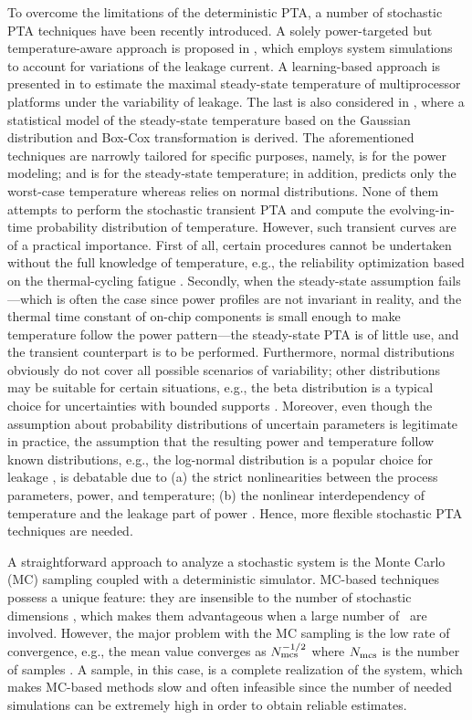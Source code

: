 To overcome the limitations of the deterministic PTA, a number of stochastic PTA techniques have been recently introduced. A solely power-targeted but temperature-aware approach is proposed in \cite{chandra2010}, which employs system simulations to account for variations of the leakage current. A learning-based approach is presented in \cite{juan2011} to estimate the maximal steady-state temperature of multiprocessor platforms under the variability of leakage. The last is also considered in \cite{juan2012}, where a statistical model of the steady-state temperature based on the Gaussian distribution and Box-Cox transformation is derived. The aforementioned techniques are narrowly tailored for specific purposes, namely, \cite{chandra2010} is for the power modeling; \cite{juan2011} and \cite{juan2012} is for the steady-state temperature; in addition, \cite{juan2011} predicts only the worst-case temperature whereas \cite{juan2012} relies on normal distributions. None of them attempts to perform the stochastic transient PTA and compute the evolving-in-time probability distribution of temperature. However, such transient curves are of a practical importance. First of all, certain procedures cannot be undertaken without the full knowledge of temperature, e.g., the reliability optimization based on the thermal-cycling fatigue \cite{ukhov2012}. Secondly, when the steady-state assumption fails---which is often the case since power profiles are not invariant in reality, and the thermal time constant of on-chip components is small enough to make temperature follow the power pattern---the steady-state PTA is of little use, and the transient counterpart is to be performed. Furthermore, normal distributions obviously do not cover all possible scenarios of variability; other distributions may be suitable for certain situations, e.g., the beta distribution is a typical choice for uncertainties with bounded supports \cite{maitre2010}. Moreover, even though the assumption about probability distributions of uncertain parameters is legitimate in practice, the assumption that the resulting power and temperature follow known distributions, e.g., the log-normal distribution is a popular choice for leakage \cite{srivastava2010}, is debatable due to (a) the strict nonlinearities between the process parameters, power, and temperature; (b) the nonlinear interdependency of temperature and the leakage part of power \cite{liu2007}. Hence, more flexible stochastic PTA techniques are needed.

A straightforward approach to analyze a stochastic system is the Monte Carlo (MC) sampling coupled with a deterministic simulator. MC-based techniques possess a unique feature: they are insensible to the number of stochastic dimensions \cite{maitre2010}, which makes them advantageous when a large number of \rvs\ are involved. However, the major problem with the MC sampling is the low rate of convergence, e.g., the mean value converges as $N_\text{mcs}^{-{{1}/{2}}}$ where $N_\text{mcs}$ is the number of samples \cite{xiu2010, maitre2010}. A sample, in this case, is a complete realization of the system, which makes MC-based methods slow and often infeasible since the number of needed simulations can be extremely high in order to obtain reliable estimates.

